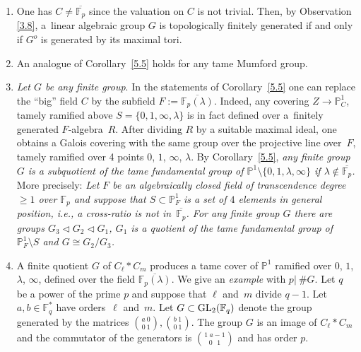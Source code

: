 \documentclass[10pt,a4paper]{amsart}
\numberwithin{equation}{section}
\begin{document}
\begin{Observations}\label{5.6}\quad
\begin{enumerate}\itemsep=0pt
\item[(1)] One has $C\neq \overline{\mathbb{F}_p}$ since the valuation on $C$ is not trivial. Then, by Observation \ref{3.8}, a~linear algebraic group $G$ is topologically finitely generated if and only if $G^o$ is generated by its maximal tori.
\item[(2)] An analogue of Corollary~\ref{5.5} holds for any tame Mumford group.
\item[(3)] {\it Let $G$ be any finite group}. In the statements of Corollary~\ref{5.5} one can replace the ``big'' field $C$ by the subfield $F:=\overline{\mathbb{F}_p(\lambda)}$. Indeed, any covering $Z\rightarrow \mathbb{P}_C^1$, tamely ramified above $S=\{0,1,\infty ,\lambda\}$ is in fact defined over a~finitely generated $F$-algebra~$R$. After dividing $R$ by a suitable maximal ideal, one obtains a Galois covering with the same group over the projective line over~$F$, tamely ramified over 4 points $0$, $1$, $\infty$, $\lambda$. By Corollary~\ref{5.5}, {\it any finite group $G$ is a subquotient of the tame fundamental group of $\mathbb{P}^1\setminus \{0,1,\lambda ,\infty \}$ if $\lambda \not \in \overline{\mathbb{F}_p}$.}
More precisely: {\it Let $F$ be an algebraically closed field of transcendence degree $\geq 1$ over $\mathbb{F}_p$ and suppose that $S\subset \mathbb{P}^1_F$ is a set of $4$ elements in general position, i.e., a cross-ratio is not in~$\overline{\mathbb{F}_p}$. For any finite group $G$ there are groups $G_3\lhd G_2\lhd G_1$, $G_1$ is a quotient of the tame fundamental group of $\mathbb{P}^1_F\setminus S$ and $G\cong G_2/G_3$.}

\item[(4)] A finite quotient $G$ of $C_\ell \ast C_m$ produces a tame cover of $\mathbb{P}^1$ ramified over $0$, $1$, $\lambda$, $\infty$, defined over the field $\overline{\mathbb{F}_p(\lambda)}$. We give an {\it example} with $p|\ \#G$. Let $q$ be a power of the prime $p$ and suppose that $\ell$ and~$m$ divide $q-1$. Let $a, b\in \mathbb{F}_q^*$ have orders~$\ell$ and~$m$. Let $G\subset {\rm GL}_2(\mathbb{F}_q)$ denote the group generated by the matrices ${a\ 0\choose 0\ 1},{b\ 1\choose 0\ 1 }$. The group $G$ is an image of $C_\ell \ast C_m$ and the commutator of the generators is ${1\ a-1\choose 0\ \ \ 1 }$ and has order $p$.
\end{enumerate}
\end{Observations}
\end{document}
